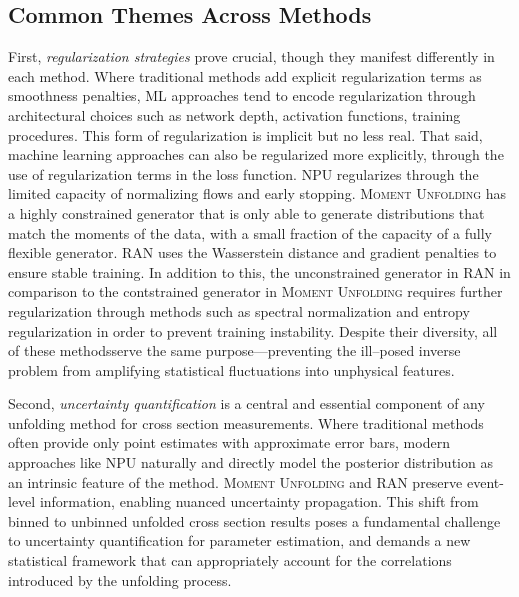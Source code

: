     \subsection{Common Themes Across Methods}
        First, \emph{regularization strategies} prove crucial, though they manifest differently in each method.
        Where traditional methods add explicit regularization terms as smoothness penalties, ML approaches tend to encode regularization through architectural choices such as network depth, activation functions, training procedures.
        This form of regularization is implicit but no less real.
        That said, machine learning approaches can also be regularized more explicitly, through the use of regularization terms in the loss function.
        NPU regularizes through the limited capacity of normalizing flows and early stopping.
        \textsc{Moment Unfolding} has a highly constrained generator that is only able to generate distributions that match the moments of the data, with a small fraction of the capacity of a fully flexible generator.
        RAN uses the Wasserstein distance and gradient penalties to ensure stable training.
        In addition to this, the unconstrained generator in RAN in comparison to the contstrained generator in \textsc{Moment Unfolding} requires further regularization through methods such as spectral normalization and entropy regularization in order to prevent training instability.
        Despite their diversity, all of these methodsserve the same purpose---preventing the ill--posed inverse problem from amplifying statistical fluctuations into unphysical features.

        Second, \emph{uncertainty quantification} is a central and essential component of any unfolding method for cross section measurements.
        Where traditional methods often provide only point estimates with approximate error bars, modern approaches like NPU naturally and directly model the posterior distribution as an intrinsic feature of the method.
        \textsc{Moment Unfolding} and RAN preserve event-level information, enabling nuanced uncertainty propagation.
        This shift from binned to unbinned unfolded cross section results poses a fundamental challenge to uncertainty quantification for parameter estimation, and demands a new statistical framework that can appropriately account for the correlations introduced by the unfolding process.

